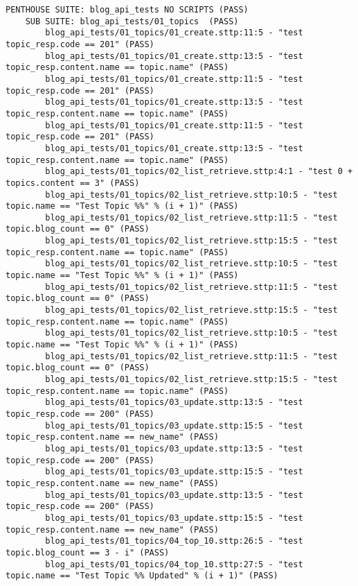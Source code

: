 \begin{verbatim}
PENTHOUSE SUITE: blog_api_tests NO SCRIPTS (PASS)
    SUB SUITE: blog_api_tests/01_topics  (PASS)
        blog_api_tests/01_topics/01_create.sttp:11:5 - "test topic_resp.code == 201" (PASS)
        blog_api_tests/01_topics/01_create.sttp:13:5 - "test topic_resp.content.name == topic.name" (PASS)
        blog_api_tests/01_topics/01_create.sttp:11:5 - "test topic_resp.code == 201" (PASS)
        blog_api_tests/01_topics/01_create.sttp:13:5 - "test topic_resp.content.name == topic.name" (PASS)
        blog_api_tests/01_topics/01_create.sttp:11:5 - "test topic_resp.code == 201" (PASS)
        blog_api_tests/01_topics/01_create.sttp:13:5 - "test topic_resp.content.name == topic.name" (PASS)
        blog_api_tests/01_topics/02_list_retrieve.sttp:4:1 - "test 0 + topics.content == 3" (PASS)
        blog_api_tests/01_topics/02_list_retrieve.sttp:10:5 - "test topic.name == "Test Topic %%" % (i + 1)" (PASS)
        blog_api_tests/01_topics/02_list_retrieve.sttp:11:5 - "test topic.blog_count == 0" (PASS)
        blog_api_tests/01_topics/02_list_retrieve.sttp:15:5 - "test topic_resp.content.name == topic.name" (PASS)
        blog_api_tests/01_topics/02_list_retrieve.sttp:10:5 - "test topic.name == "Test Topic %%" % (i + 1)" (PASS)
        blog_api_tests/01_topics/02_list_retrieve.sttp:11:5 - "test topic.blog_count == 0" (PASS)
        blog_api_tests/01_topics/02_list_retrieve.sttp:15:5 - "test topic_resp.content.name == topic.name" (PASS)
        blog_api_tests/01_topics/02_list_retrieve.sttp:10:5 - "test topic.name == "Test Topic %%" % (i + 1)" (PASS)
        blog_api_tests/01_topics/02_list_retrieve.sttp:11:5 - "test topic.blog_count == 0" (PASS)
        blog_api_tests/01_topics/02_list_retrieve.sttp:15:5 - "test topic_resp.content.name == topic.name" (PASS)
        blog_api_tests/01_topics/03_update.sttp:13:5 - "test topic_resp.code == 200" (PASS)
        blog_api_tests/01_topics/03_update.sttp:15:5 - "test topic_resp.content.name == new_name" (PASS)
        blog_api_tests/01_topics/03_update.sttp:13:5 - "test topic_resp.code == 200" (PASS)
        blog_api_tests/01_topics/03_update.sttp:15:5 - "test topic_resp.content.name == new_name" (PASS)
        blog_api_tests/01_topics/03_update.sttp:13:5 - "test topic_resp.code == 200" (PASS)
        blog_api_tests/01_topics/03_update.sttp:15:5 - "test topic_resp.content.name == new_name" (PASS)
        blog_api_tests/01_topics/04_top_10.sttp:26:5 - "test topic.blog_count == 3 - i" (PASS)
        blog_api_tests/01_topics/04_top_10.sttp:27:5 - "test topic.name == "Test Topic %% Updated" % (i + 1)" (PASS)

\end{verbatim}
